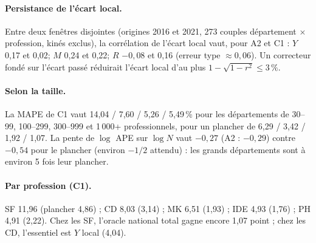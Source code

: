 \paragraph{Persistance de l'écart local.} Entre deux fenêtres disjointes (origines 2016 et 2021,
273\mesure{} couples département $\times$ profession, kinés exclus), la corrélation de l'écart local vaut,
pour A2 et C1 : $Y$ 0,17 et 0,02\mesure ; $M$ 0,24 et 0,22\mesure ; $R$ $-0{,}08$ et 0,16\mesure{} (erreur
type $\approx 0{,}06$\derive). Un correcteur fondé sur l'écart passé réduirait l'écart local d'au plus
$1 - \sqrt{1 - r^2} \le 3\,\%$\derive.

\paragraph{Selon la taille.} La MAPE de C1 vaut 14,04 / 7,60 / 5,26 / 5,49\,\%\mesure{} pour les
départements de 30--99, 100--299, 300--999 et 1\,000+ professionnels, pour un plancher de 6,29 / 3,42 /
1,92 / 1,07\derive. La pente de $\log$ APE sur $\log N$ vaut $-0{,}27$\mesure{} (A2 : $-0{,}29$\mesure)
contre $-0{,}54$\derive{} pour le plancher (environ $-1/2$ attendu) : les grands départements sont à environ
5 fois\derive{} leur plancher.

\paragraph{Par profession (C1).} SF 11,96 (plancher 4,86) ; CD 8,03 (3,14) ; MK 6,51 (1,93) ; IDE 4,93
(1,76) ; PH 4,91 (2,22)\mesure. Chez les SF, l'oracle national total gagne encore 1,07\mesure{} point ; chez
les CD, l'essentiel est $Y$ local (4,04\mesure).


